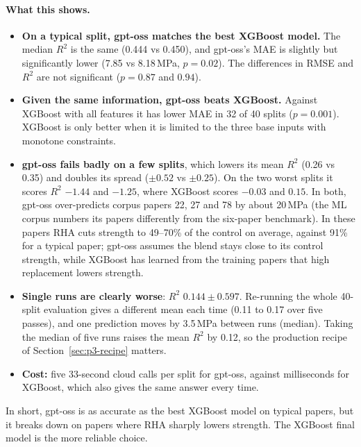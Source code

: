 \documentclass[11pt]{article}
\newcommand{\R}{$R^2$}
\begin{document}
\paragraph{What this shows.}
\begin{itemize}\itemsep2pt
  \item \textbf{On a typical split, gpt-oss matches the best XGBoost model.} The median
        \R{} is the same (0.444 vs 0.450), and gpt-oss's MAE is slightly but significantly
        lower (7.85 vs 8.18\,MPa, $p=0.02$). The differences in RMSE and \R{} are not
        significant ($p=0.87$ and $0.94$).
  \item \textbf{Given the same information, gpt-oss beats XGBoost.} Against XGBoost with
        all features it has lower MAE in 32 of 40 splits ($p=0.001$). XGBoost is only
        better when it is limited to the three base inputs with monotone constraints.
  \item \textbf{gpt-oss fails badly on a few splits}, which lowers its mean \R{} (0.26 vs
        0.35) and doubles its spread ($\pm0.52$ vs $\pm0.25$). On the two worst splits it
        scores \R{} $-1.44$ and $-1.25$, where XGBoost scores $-0.03$ and $0.15$. In both,
        gpt-oss over-predicts corpus papers 22, 27 and 78 by about 20\,MPa (the ML corpus
        numbers its papers differently from the six-paper benchmark). In these papers RHA
        cuts strength to 49--70\% of the control on average, against 91\% for a typical
        paper; gpt-oss assumes the blend stays close to its control strength, while
        XGBoost has learned from the training papers that high replacement lowers
        strength.
  \item \textbf{Single runs are clearly worse}: \R{} $0.144\pm0.597$. Re-running the whole
        40-split evaluation gives a different mean each time (0.11 to 0.17 over five
        passes), and one prediction moves by 3.5\,MPa between runs (median). Taking the
        median of five runs raises the mean \R{} by 0.12, so the production recipe of
        Section~\ref{sec:p3-recipe} matters.
  \item \textbf{Cost:} five 33-second cloud calls per split for gpt-oss, against
        milliseconds for XGBoost, which also gives the same answer every time.
\end{itemize}

\noindent In short, gpt-oss is as accurate as the best XGBoost model on typical papers,
but it breaks down on papers where RHA sharply lowers strength. The XGBoost final model
is the more reliable choice.
\end{document}
